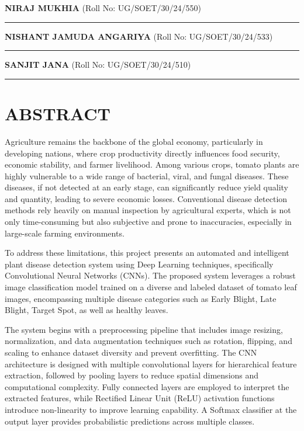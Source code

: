 \documentclass[
]{article}
\begin{document}
\textbf{NIRAJ MUKHIA} (Roll No: UG/SOET/30/24/550)

\begin{center}\rule{0.5\linewidth}{0.5pt}\end{center}

\textbf{NISHANT JAMUDA ANGARIYA} (Roll No: UG/SOET/30/24/533)

\begin{center}\rule{0.5\linewidth}{0.5pt}\end{center}

\textbf{SANJIT JANA} (Roll No: UG/SOET/30/24/510)

\begin{center}\rule{0.5\linewidth}{0.5pt}\end{center}

\section{ABSTRACT}\label{abstract}

Agriculture remains the backbone of the global economy, particularly in
developing nations, where crop productivity directly influences food
security, economic stability, and farmer livelihood. Among various
crops, tomato plants are highly vulnerable to a wide range of bacterial,
viral, and fungal diseases. These diseases, if not detected at an early
stage, can significantly reduce yield quality and quantity, leading to
severe economic losses. Conventional disease detection methods rely
heavily on manual inspection by agricultural experts, which is not only
time-consuming but also subjective and prone to inaccuracies, especially
in large-scale farming environments.

To address these limitations, this project presents an automated and
intelligent plant disease detection system using Deep Learning
techniques, specifically Convolutional Neural Networks (CNNs). The
proposed system leverages a robust image classification model trained on
a diverse and labeled dataset of tomato leaf images, encompassing
multiple disease categories such as Early Blight, Late Blight, Target
Spot, as well as healthy leaves.

The system begins with a preprocessing pipeline that includes image
resizing, normalization, and data augmentation techniques such as
rotation, flipping, and scaling to enhance dataset diversity and prevent
overfitting. The CNN architecture is designed with multiple
convolutional layers for hierarchical feature extraction, followed by
pooling layers to reduce spatial dimensions and computational
complexity. Fully connected layers are employed to interpret the
extracted features, while Rectified Linear Unit (ReLU) activation
functions introduce non-linearity to improve learning capability. A
Softmax classifier at the output layer provides probabilistic
predictions across multiple classes.
\end{document}
